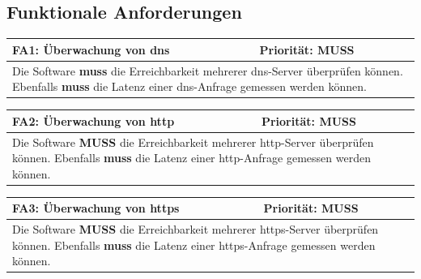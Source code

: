 \documentclass[titlepage]{report}
\begin{document}
\subsection{Funktionale Anforderungen}
\begin{center}
\begin{tabular}{p{}>{\raggedleft\arraybackslash}p{}}\toprule
    \textbf{FA1: Überwachung von \gls{dns} } & \textbf{Priorität: MUSS} \\\midrule
	\multicolumn{2}{p{\textwidth-\tabcolsep}}{%
        Die Software \textbf{muss} die Erreichbarkeit mehrerer
        \gls{dns}\hyp{}Server überprüfen können. Ebenfalls \textbf{muss} die
        Latenz einer \gls{dns}\hyp{}Anfrage gemessen werden können.}\\\bottomrule
\end{tabular}
    \label{table:FA1}
\end{center}
\begin{center}
\begin{tabular}{p{}>{\raggedleft\arraybackslash}p{}}\toprule
    \textbf{FA2: Überwachung von \gls{http} } & \textbf{Priorität: MUSS} \\\midrule
	\multicolumn{2}{p{\textwidth-\tabcolsep}}{%
        Die Software \textbf{MUSS} die Erreichbarkeit mehrerer
        \gls{http}\hyp{}Server überprüfen können. Ebenfalls
        \textbf{muss} die Latenz einer \gls{http}\hyp{}Anfrage gemessen werden können.}\\\bottomrule
\end{tabular}
    \label{table:FA2}
\end{center}
\begin{center}
\begin{tabular}{p{}>{\raggedleft\arraybackslash}p{}}\toprule
    \textbf{FA3: Überwachung von \gls{https} } & \textbf{Priorität: MUSS} \\\midrule
	\multicolumn{2}{p{\textwidth-\tabcolsep}}{%
        Die Software \textbf{MUSS} die Erreichbarkeit mehrerer
        \gls{https}\hyp{}Server überprüfen können. Ebenfalls \textbf{muss} die
        Latenz einer \gls{https}\hyp{}Anfrage gemessen werden können.}\\\bottomrule
\end{tabular}
    \label{table:FA3}
\end{center}
\end{document}
